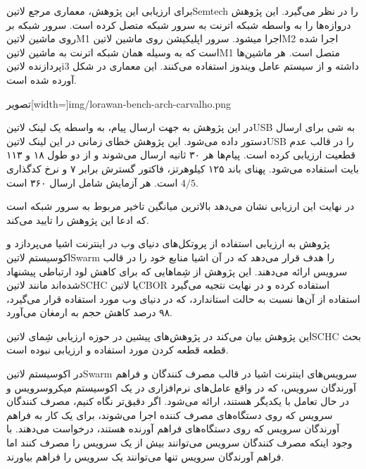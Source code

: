 برای ارزیابی این پژوهش، معماری مرجع ‌لاتین{Semtech} را در نظر می‌گیرد. این پژوهش دروازه‌ها را به واسطه شبکه اترنت به سرور شبکه متصل کرده است.
سرور شبکه بر روی ماشین ‌لاتین{M1} اجرا میشود. سرور اپلیکیشن روی ماشین ‌لاتین{M2} اجرا شده است که به وسیله همان شبکه اترنت به ماشین ‌لاتین{M1}
متصل است. هر ماشین‌ها پردازنده ‌لاتین{i3} داشته و از سیستم عامل ویندوز استفاده می‌کنند.
این معماری در شکل 
آورده شده است.

‌تصویر[width=\textwidth]{img/lorawan-bench-arch-carvalho.png}

در این پژوهش به جهت ارسال پیام، به واسطه یک لینک ‌لاتین{USB} به شی برای ارسال دستور داده می‌شود. این پژوهش خطای زمانی
در این لینک ‌لاتین{USB} را در قالب عدم قطعیت ارزیابی کرده است. پیام‌ها هر ۳۰ ثانیه ارسال می‌شوند و از دو طول ۱۸ و ۱۱۳ بایت استفاده می‌شود.
پهنای باند ۱۲۵ کیلوهرتز، فاکتور گسترش برابر ۷ و نرخ کدگذاری $4/5$ است.
هر آزمایش شامل ارسال ۳۶۰ است.

در نهایت این ارزیابی نشان می‌دهد بالاترین میانگین تاخیر مربوط به سرور شبکه است که ادعا این پژوهش را تایید می‌کند.



پژوهش  به ارزیابی استفاده از پروتکل‌های دنیای وب در اینترنت اشیا می‌پردازد و اکوسیستم ‌لاتین{Swarm} را هدف قرار می‌دهد که در آن اشیا
منابع خود را در قالب سرویس ارائه می‌دهند. این پژوهش از شِماهایی که برای کاهش لود ارتباطی پیشنهاد شده‌اند مانند ‌لاتین{SCHC} یا ‌لاتین{CBOR}
استفاده کرده و در نهایت نتجیه می‌گیرد استفاده از آن‌ها نسبت به حالت استاندارد، که در دنیای وب مورد استفاده قرار می‌گیرد، ۹۸ درصد کاهش حجم به ارمغان می‌آورد.

این پژوهش بیان می‌کند در پژوهش‌های پیشین در حوزه ارزیابی شِمای ‌لاتین{SCHC} بحث قطعه قطعه کردن مورد استفاده و ارزیابی نبوده است.

در اکوسیستم ‌لاتین{Swarm} سرویس‌های اینترنت اشیا در قالب مصرف کنندگان و فراهم آورندگان سرویس،
که در واقع عامل‌های نرم‌افزاری در یک اکوسیستم میکروسرویس و در حال تعامل با یکدیگر هستند،
ارائه می‌شود.
اگر دقیق‌تر نگاه کنیم، مصرف کنندگان سرویس که روی دستگاه‌های مصرف کننده اجرا می‌شوند، برای یک کار
به فراهم آورندگان سرویس که روی دستگاه‌های فراهم آورنده هستند، درخواست می‌دهند.
با وجود اینکه مصرف کنندگان سرویس می‌توانند بیش از یک سرویس را مصرف کنند اما فراهم آورندگان سرویس
تنها می‌توانند یک سرویس را فراهم بیاورند.

